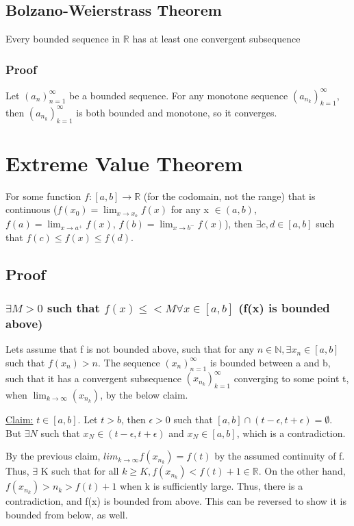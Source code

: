 \documentclass[11 pt, twoside]{article}
\begin{document}
\subsection{Bolzano-Weierstrass Theorem}
Every bounded sequence in $\mathbb{R}$ has at least one convergent subsequence

\subsubsection{Proof}
Let $(a_n)^\infty_{n=1}$ be a bounded sequence. For any monotone sequence $(a_{n_k})^\infty_{k=1}$, then $(a_{n_k})^\infty_{k=1}$ is both bounded and monotone, so it converges.

\section{Extreme Value Theorem}
For some function $f:[a, b] \to \mathbb{R}$ (for the codomain, not the range) that is continuous ($f(x_0) = \lim_{x \to x_o}f(x)$ for any x $\in (a, b)$, $f(a) = \lim_{x \to a^+}f(x)$, $f(b) = \lim_{x \to b^-}f(x)$), then $\exists c, d \in [a, b]$ such that $f(c) \leq f(x) \leq f(d)$.

\subsection{Proof}
\subsubsection{$\exists M>0$ such that $f(x) \leq < M \forall x \in [a,b]$ (f(x) is bounded above)}
Lets assume that f is not bounded above, such that for any $n \in \mathbb{N}, \exists x_n \in [a, b]$ such that $f(x_n) > n$.
The sequence $(x_n)^\infty_{n=1}$ is bounded between a and b, such that it has a convergent subsequence $(x_{n_k})^\infty_{k=1}$ converging to some point t, when $ \lim_{k \to \infty}(x_{n_k})$, by the below claim.\par
\underline{Claim:} $t \in [a, b]$. 
Let $t>b$, then $\epsilon > 0$ such that $[a, b] \cap (t-\epsilon, t+\epsilon) = \emptyset$. But $\exists N$ such that $x_N \in (t-\epsilon, t+\epsilon)$ and $x_N \in [a, b]$, which is a contradiction.

By the previous claim, $lim_{k \to \infty}f(x_{n_k}) = f(t)$ by the assumed continuity of f. Thus, $\exists$ K such that for all $k \geq K, f(x_{n_k}) < f(t) + 1 \in \mathbb{R}$. On the other hand, $f(x_{n_k}) > n_k > f(t) + 1$ when k is sufficiently large. Thus, there is a contradiction, and f(x) is bounded from above. This can be reversed to show it is bounded from below, as well.
\end{document}
